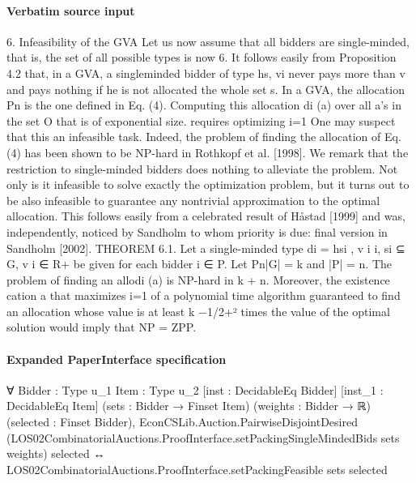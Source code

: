 \documentclass[10pt]{article}
\begin{document}
\paragraph{Verbatim source input}
\begin{ReviewVerbatim}
6. Infeasibility of the GVA
Let us now assume that all bidders are single-minded, that is, the set of all possible
types is now 6. It follows easily from Proposition 4.2 that, in a GVA, a singleminded bidder of type hs, vi never pays more than v and pays nothing if he is not
allocated the whole set s.
In a GVA, the allocation
Pn is the one defined in Eq. (4). Computing this allocation
di (a) over all a’s in the set O that is of exponential size.
requires optimizing i=1
One may suspect that this an infeasible task. Indeed, the problem of finding the
allocation of Eq. (4) has been shown to be NP-hard in Rothkopf et al. [1998]. We
remark that the restriction to single-minded bidders does nothing to alleviate the
problem. Not only is it infeasible to solve exactly the optimization problem, but
it turns out to be also infeasible to guarantee any nontrivial approximation to the
optimal allocation. This follows easily from a celebrated result of Håstad [1999]
and was, independently, noticed by Sandholm to whom priority is due: final version
in Sandholm [2002].
THEOREM 6.1. Let a single-minded type di = hsi , v i i, si ⊆ G, v i ∈ R+ be given
for each bidder i ∈ P. Let
Pn|G| = k and |P| = n. The problem of finding an allodi (a) is NP-hard in k + n. Moreover, the existence
cation a that maximizes i=1
of a polynomial time algorithm guaranteed to find an allocation whose value is at
least k −1/2+² times the value of the optimal solution would imply that NP = ZPP.
\end{ReviewVerbatim}


\paragraph{Expanded PaperInterface specification}
\begin{ReviewVerbatim}
∀ {Bidder : Type u_1} {Item : Type u_2} [inst : DecidableEq Bidder] [inst_1 : DecidableEq Item]
  (sets : Bidder → Finset Item) (weights : Bidder → ℝ) (selected : Finset Bidder),
  EconCSLib.Auction.PairwiseDisjointDesired
      (LOS02CombinatorialAuctions.ProofInterface.setPackingSingleMindedBids sets weights) selected ↔
    LOS02CombinatorialAuctions.ProofInterface.setPackingFeasible sets selected
\end{ReviewVerbatim}
\end{document}
